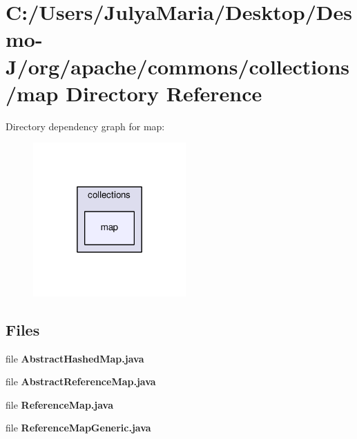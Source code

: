 \section{C\-:/\-Users/\-Julya\-Maria/\-Desktop/\-Desmo-\/\-J/org/apache/commons/collections/map Directory Reference}
\label{dir_4b9dfa8ccf827cf6888355c3ba0f2581}
Directory dependency graph for map\-:
\nopagebreak
\begin{figure}[H]
\begin{center}
\leavevmode
\includegraphics[width=166pt]{dir_4b9dfa8ccf827cf6888355c3ba0f2581_dep}
\end{center}
\end{figure}
\subsection*{Files}
\begin{DoxyCompactItemize}
\item 
file {\bfseries Abstract\-Hashed\-Map.\-java}
\item 
file {\bfseries Abstract\-Reference\-Map.\-java}
\item 
file {\bfseries Reference\-Map.\-java}
\item 
file {\bfseries Reference\-Map\-Generic.\-java}
\end{DoxyCompactItemize}
